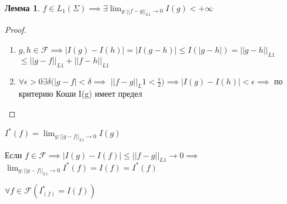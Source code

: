 \documentclass[a4paper, 12pt]{article}
\newtheorem{lemma}{Лемма}[section]
\theoremstyle{definition}
\theoremstyle{remark}
\begin{document}
     \begin{lemma}
          $f\in L_1(\Sigma)\implies \exists \lim_{g:||f-g||_{L1}\to 0} I(g)< +\infty $
     \end{lemma}
     \begin{proof}
          \begin{enumerate}
               \item $g, h\in\mathcal{F} \implies |I(g) - I(h)| = |I(g-h)|\leq I(|g-h|) = ||g-h||_{L1}$
               $\leq ||g-f||_{L1} + ||f-h||_{L1}$
               \item $\forall \epsilon >0 \exists \delta (|g-f|< \delta \implies$
               $||f-g||_L1<\frac{\epsilon}{2})\implies |I(g) - I(h)|<\epsilon\implies $ по критерию Коши I(g) имеет предел
          \end{enumerate}
     \end{proof}
     $I^*(f) = \lim_{g:||g-f||_{L1}\to 0} I(g)$

     Если $f\in\mathcal{F} \implies|I(g) - I(f)|\leq||f-g||_{L1}\to 0\implies$
     $\lim_{g:||g-f||_{L1}\to0} I^*(f) = I(f) = I^*(f)$

     $\forall f\in\mathcal{F} (I^*_(f) = I(f))$
\end{document}
